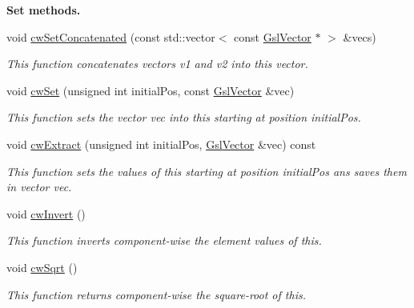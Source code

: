 \begin{Indent}{\bf Set methods.}
\begin{DoxyCompactItemize}
void \hyperlink{class_q_u_e_s_o_1_1_gsl_vector_a498269f6ee2cfa975ebf4082ea5ad1a8}{cw\-Set\-Concatenated} (const std\-::vector$<$ const \hyperlink{class_q_u_e_s_o_1_1_gsl_vector}{Gsl\-Vector} $\ast$ $>$ \&vecs)
\begin{DoxyCompactList}\small\item\em This function concatenates vectors {\ttfamily v1} and {\ttfamily v2} into {\ttfamily this} vector. \end{DoxyCompactList}\item 
void \hyperlink{class_q_u_e_s_o_1_1_gsl_vector_ab41a8babfcfd0589e23155979ad90ecb}{cw\-Set} (unsigned int initial\-Pos, const \hyperlink{class_q_u_e_s_o_1_1_gsl_vector}{Gsl\-Vector} \&vec)
\begin{DoxyCompactList}\small\item\em This function sets the vector vec into {\ttfamily this} starting at position initial\-Pos. \end{DoxyCompactList}\item 
void \hyperlink{class_q_u_e_s_o_1_1_gsl_vector_abddb8cf9c1a8e596b1c7f02fbad26464}{cw\-Extract} (unsigned int initial\-Pos, \hyperlink{class_q_u_e_s_o_1_1_gsl_vector}{Gsl\-Vector} \&vec) const 
\begin{DoxyCompactList}\small\item\em This function sets the values of this starting at position initial\-Pos ans saves them in vector vec. \end{DoxyCompactList}\item 
void \hyperlink{class_q_u_e_s_o_1_1_gsl_vector_a55254ab9351f6ef2217aa167bb9dcbd4}{cw\-Invert} ()
\begin{DoxyCompactList}\small\item\em This function inverts component-\/wise the element values of {\ttfamily this}. \end{DoxyCompactList}\item 
void \hyperlink{class_q_u_e_s_o_1_1_gsl_vector_a6b820b96b5b7e8a1af21c4f260a0dade}{cw\-Sqrt} ()
\begin{DoxyCompactList}\small\item\em This function returns component-\/wise the square-\/root of {\ttfamily this}. \end{DoxyCompactList}\end{DoxyCompactItemize}
\end{Indent}
